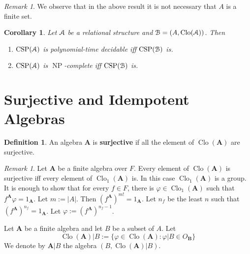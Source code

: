 \documentclass{amsart}
\theoremstyle{plain}
\newtheorem{corollary}[theorem]{Corollary}
\theoremstyle{definition}
\newtheorem{definition}[theorem]{Definition}
\theoremstyle{remark}
\newtheorem{remark}[theorem]{Remark}
\def\phi{\varphi}
\DeclareMathOperator{\Clo}{Clo}
\DeclareMathOperator{\CSP}{CSP}
\DeclareMathOperator{\NP}{NP}
\begin{document}
\begin{remark}
    We observe that in the above result it is not necessary that $A$ is a finite set. 
\end{remark}

\begin{corollary}
    Let $\EuScript{A}$ be a relational structure and $\EuScript{B}=(A, \Clo(\EuScript{A}))$. 
    Then 
    \begin{enumerate}
        \item $\CSP(\EuScript{A})$ is polynomial-time decidable iff $\CSP(\EuScript{B})$ is. 
        \item $\CSP(\EuScript{A})$ is $\NP$-complete iff $\CSP(\EuScript{B})$ is. 
    \end{enumerate}
    \begin{comment}
    \begin{proof}
        We prove that $\CSP(\EuScript{A})$ is polynomial-time equivalent to $\CSP(\EuScript{B})$. 
        Let $\EuScript{A}=(A,P)$. 
        Let $\Sigma$ be a finite set of atomic formulas over $P$. 

    \end{proof}
\end{comment}
\end{corollary}

\section{Surjective and Idempotent Algebras}

\begin{definition}
    An algebra $\mathbf{A}$ is \textbf{surjective} if all the element of $\Clo(\mathbf{A})$ are surjective. 
\end{definition}

\begin{remark}
    \label{surj_group}
    Let $\mathbf{A}$ be a finite algebra over $F$. 
    Every element of $\Clo(\mathbf{A})$ is surjective iff every element of $\Clo_1(\mathbf{A})$ is. 
    In this case $\Clo_1(\mathbf{A})$ is a group.
    It is enough to show that for every $f \in F$, there is $\phi \in \Clo_1(\mathbf{A})$ such that $f^\mathbf{A} \phi = 1_\mathbf{A}$. 
    Let $m:=|A|$. 
    Then $(f^{\mathbf{A}})^{m!}=1_\mathbf{A}$.
    Let $n_f$ be the least $n$ such that $(f^{\mathbf{A}})^{n_f}=1_\mathbf{A}$. 
    Let $\phi:=(f^{\mathbf{A}})^{n_f-1}$. 
\end{remark}

Let $\mathbf{A}$ be a finite algebra and let $B$ be a subset of $A$. 
Let 
\begin{equation*}
    \Clo(\mathbf{A})|B:=\{\phi \in \Clo(\mathbf{A}): \phi | B \in O_{\mathbf{B}} \}
\end{equation*} 
We denote by $\mathbf{A}|B$ the algebra $(B, \Clo(\mathbf{A})|B)$. 
\end{document}
